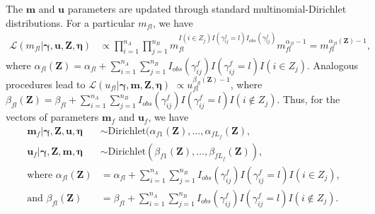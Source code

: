 \documentclass[12pt,letterpaper]{article}
\newcommand{\1}[1]{\mathbb{I}\!\left[#1\right]} %
\begin{document}
The $\bm{m}$ and $\bm{u}$ parameters are updated through standard multinomial-Dirichlet distributions. For a particular $m_{fl}$, we have
\begin{align}
	\mathcal{L}(m_{fl}|\bm{\gamma}, \bm{u}, \bm{Z}, \bm{\eta}) &\propto \prod_{i=1}^{n_A} \prod_{j=1}^{n_B} m_{fl}^{I(i \in Z_j) I(\gamma_{ij}^f = l) I_{obs}(\gamma_{ij}^f)}  m_{fl}^{\alpha_{fl} - 1} = m_{fl}^{\alpha_{fl}(\bm{Z}) - 1},
\end{align}
where $\alpha_{fl}(\bm{Z})= \alpha_{fl} + \sum_{i=1}^{n_A}  \sum_{j=1}^{n_B} I_{obs}(\gamma_{ij}^f)I(\gamma_{ij}^f = l) I(i \in Z_j)$. Analogous procedures lead to $\mathcal{L}(u_{fl}| \bm{\gamma}, \bm{m}, \bm{Z}, \bm{\eta})$  $\propto u_{fl}^{\beta_{fl}(\bm{Z}) - 1}$, where $\beta_{fl}(\bm{Z})= \beta_{fl} + \sum_{i=1}^{n_A}  \sum_{j=1}^{n_B} I_{obs}(\gamma_{ij}^f)I(\gamma_{ij}^f = l) I(i \notin Z_j)$. Thus, for the vectors of parameters $\bm{m}_f$ and $\bm{u}_f$, we have
	\begin{align}
		\bm{m}_f|\bm{\gamma}, \bm{Z}, \bm{u}, \bm{\eta} &\sim \text{Dirichlet}(\alpha_{f1}(\bm{Z}), \ldots, \alpha_{fL_f}(\bm{Z}), \label{eqn:m_update} \\
		\bm{u}_f|\bm{\gamma}, \bm{Z}, \bm{m}, \bm{\eta} &\sim \text{Dirichlet}(\beta_{f1}(\bm{Z}), \ldots, \beta_{fL_f}(\bm{Z})), \label{eqn:u_update} \\
		\text{where }\alpha_{fl}(\bm{Z})&= \alpha_{fl} + \sum_{i=1}^{n_A}\sum_{j=1}^{n_B} I_{obs}(\gamma_{ij}^f) I(\gamma_{ij}^f = l) I(i \in Z_j), \label{eqn:alpha_update} \\
		\text{and } \beta_{fl}(\bm{Z})&=  \beta_{fl} + \sum_{i=1}^{n_A}\sum_{j=1}^{n_B}  I_{obs}(\gamma_{ij}^f) I(\gamma_{ij}^f = l) I(i \notin Z_j) \label{eqn:beta_update}.
	\end{align}
\end{document}
